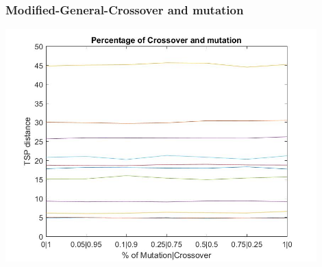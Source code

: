 \subsubsection{Modified-General-Crossover and mutation}
\begin{center}
\includegraphics[width=12cm]{img/order_crossover/crossMut.jpg}
\end{center}









